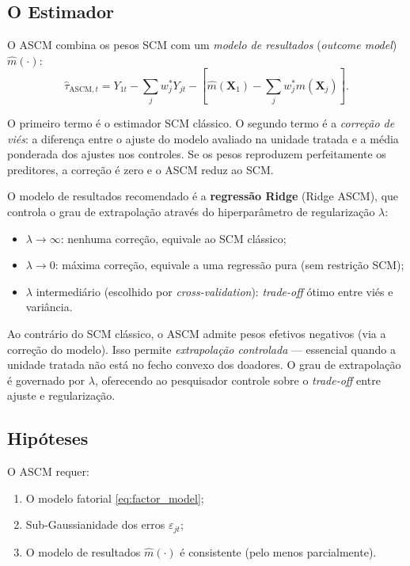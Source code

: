 \documentclass[12pt, a4paper, openany]{book}
\begin{document}
\subsection{O Estimador}

O ASCM combina os pesos SCM com um \textit{modelo de resultados} (\textit{outcome model}) $\hat{m}(\cdot)$:
\begin{equation}
  \hat{\tau}_{\text{ASCM},t} = Y_{1t} - \sum_{j} w_j^* Y_{jt} - \left[\hat{m}(\mathbf{X}_1) - \sum_{j} w_j^* \hat{m}(\mathbf{X}_j)\right].
  \label{eq:ascm}
\end{equation}

O primeiro termo é o estimador SCM clássico. O segundo termo é a \textit{correção de viés}: a diferença entre o ajuste do modelo avaliado na unidade tratada e a média ponderada dos ajustes nos controles. Se os pesos reproduzem perfeitamente os preditores, a correção é zero e o ASCM reduz ao SCM.

O modelo de resultados recomendado é a \textbf{regressão Ridge} (Ridge ASCM), que controla o grau de extrapolação através do hiperparâmetro de regularização $\lambda$:
\begin{itemize}[leftmargin=1.5cm]
  \item $\lambda \to \infty$: nenhuma correção, equivale ao SCM clássico;
  \item $\lambda \to 0$: máxima correção, equivale a uma regressão pura (sem restrição SCM);
  \item $\lambda$ intermediário (escolhido por \textit{cross-validation}): \textit{trade-off} ótimo entre viés e variância.
\end{itemize}

\begin{notabox}
Ao contrário do SCM clássico, o ASCM admite pesos efetivos negativos (via a correção do modelo). Isso permite \textit{extrapolação controlada} --- essencial quando a unidade tratada não está no fecho convexo dos doadores. O grau de extrapolação é governado por $\lambda$, oferecendo ao pesquisador controle sobre o \textit{trade-off} entre ajuste e regularização.
\end{notabox}

\subsection{Hipóteses}

O ASCM requer:
\begin{enumerate}[leftmargin=1.5cm]
  \item O modelo fatorial \eqref{eq:factor_model};
  \item Sub-Gaussianidade dos erros $\varepsilon_{jt}$;
  \item O modelo de resultados $\hat{m}(\cdot)$ é consistente (pelo menos parcialmente).
\end{enumerate}
\end{document}

